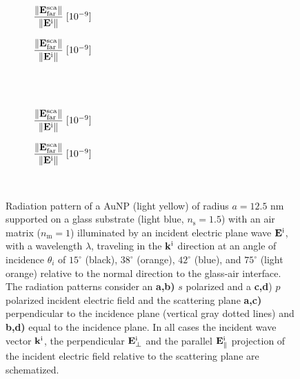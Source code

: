 \begin{figure}[t!]
    \centering
    \def\svgwidth{.8\textwidth}
    \hspace*{-.215\textwidth}%
    \vspace*{-.5em}%
        \begin{subfigure}{.32\textwidth}\caption{\footnotesize$\dfrac{\norm{\vb{E}^\text{sca}_\text{far}}}{\norm{\vb{E}^\text{i}}} \; [10^{-9}]$  }\label{sfig:Far:SuppObl:s:a}\end{subfigure}%
        \begin{subfigure}{.4\textwidth}\caption{\footnotesize$\dfrac{\norm{\vb{E}^\text{sca}_\text{far}}}{\norm{\vb{E}^\text{i}}} \; [10^{-9}]$  }\label{sfig:Far:SuppObl:s:b}\end{subfigure}\\
    \\
    \def\svgwidth{.8\textwidth}
    \hspace*{-.215\textwidth}%
    \vspace*{-.5em}%
        \begin{subfigure}{.32\textwidth}\caption{\footnotesize$\dfrac{\norm{\vb{E}^\text{sca}_\text{far}}}{\norm{\vb{E}^\text{i}}} \; [10^{-9}]$  }\label{sfig:Far:SuppObl:p:c}\end{subfigure}%
        \begin{subfigure}{.4\textwidth}\caption{\footnotesize$\dfrac{\norm{\vb{E}^\text{sca}_\text{far}}}{\norm{\vb{E}^\text{i}}} \; [10^{-9}]$  }\label{sfig:Far:SuppObl:p:d}\end{subfigure}\\
    \caption[  Radiation patterns of a AuNP supported on a substrate illuminated at oblique incidence]{Radiation pattern of a AuNP (light yellow) of radius $a = 12.5$ nm supported on a glass substrate (light blue, $n_\text{s} = 1.5$) with an air matrix ($n_\text{m} = 1$) illuminated by an incident electric plane wave $\vb{E}^\text{i}$, with a wavelength $\lambda$, traveling in the $\vb{k}^\text{i}$ direction at an angle of incidence $\theta_i$ of $15^\circ$ (black),  $38^\circ$ (orange),  $42^\circ$ (blue), and  $75^\circ$ (light orange) relative to the normal direction to the glass-air interface. The radiation patterns consider an \textbf{a,b)} $s$ polarized and  a \textbf{c,d}) $p$ polarized incident electric field and the scattering plane \textbf{a,c)} perpendicular to the incidence plane (vertical gray dotted lines) and \textbf{b,d)} equal to the incidence plane. In all cases the incident wave vector $\vb{k}^\text{i}$, the perpendicular $\vb{E}_\perp^\text{i}$ and the  parallel $\vb{E}_\parallel^\text{i}$ projection of the incident electric field relative to the scattering plane are schematized.%
    }
    \label{fig:Far:SuppObl}
\end{figure}

